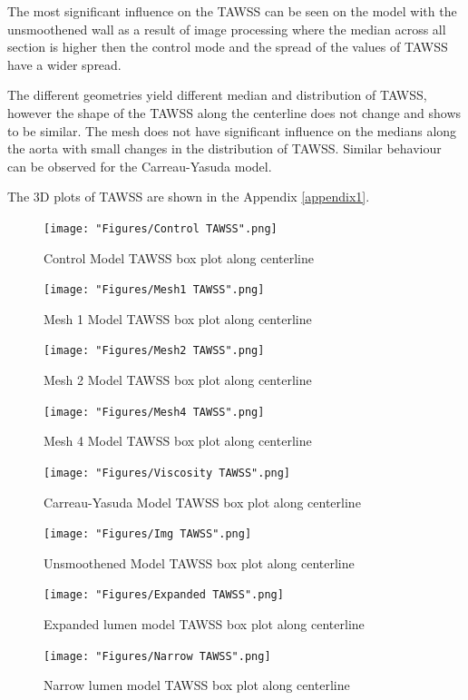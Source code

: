 The most significant influence on the TAWSS can be seen on the model with the unsmoothened wall as a result of image processing where the median across all section is higher then the control mode and the spread of the values of TAWSS have a wider spread. \par

The different geometries yield different median and distribution of TAWSS, however the shape of the TAWSS along the centerline does not change and shows to be similar. The mesh does not have significant influence on the medians along the aorta with small changes in the distribution of TAWSS. Similar behaviour can be observed for the Carreau-Yasuda model. \par

The 3D plots of TAWSS are shown in the Appendix \ref{appendix1}.

\begin{figure}[ht!]
    \centering
    \texttt{[image: "Figures/Control TAWSS".png]}
    \caption{Control Model TAWSS box plot along centerline}
    \label{fig:TAWSScontrol}
\end{figure}
\begin{figure}[ht!]
    \centering
    \texttt{[image: "Figures/Mesh1 TAWSS".png]}
    \caption{Mesh 1 Model TAWSS box plot along centerline}
    \label{fig:TAWSSMesh1}
\end{figure}
\begin{figure}[ht!]
    \centering
    \texttt{[image: "Figures/Mesh2 TAWSS".png]}
    \caption{Mesh 2 Model TAWSS box plot along centerline}
    \label{fig:TAWSSMesh2}
\end{figure}
\begin{figure}[ht!]
    \centering
    \texttt{[image: "Figures/Mesh4 TAWSS".png]}
    \caption{Mesh 4 Model TAWSS box plot along centerline}
    \label{fig:TAWSSMesh4}
\end{figure}
\begin{figure}[ht!]
    \centering
    \texttt{[image: "Figures/Viscosity TAWSS".png]}
    \caption{Carreau-Yasuda Model TAWSS box plot along centerline}
    \label{fig:TAWSSVis}
\end{figure}
\begin{figure}[ht!]
    \centering
    \texttt{[image: "Figures/Img TAWSS".png]}
    \caption{Unsmoothened Model TAWSS box plot along centerline}
    \label{fig:TAWSSImg}
\end{figure}
\begin{figure}[ht!]
    \centering
    \texttt{[image: "Figures/Expanded TAWSS".png]}
    \caption{Expanded lumen model TAWSS box plot along centerline}
    \label{fig:TAWSSGeo1}
\end{figure}
\begin{figure}[ht!]
    \centering
    \texttt{[image: "Figures/Narrow TAWSS".png]}
    \caption{Narrow lumen model TAWSS box plot along centerline}
    \label{fig:TAWSSGeo2}
\end{figure}


